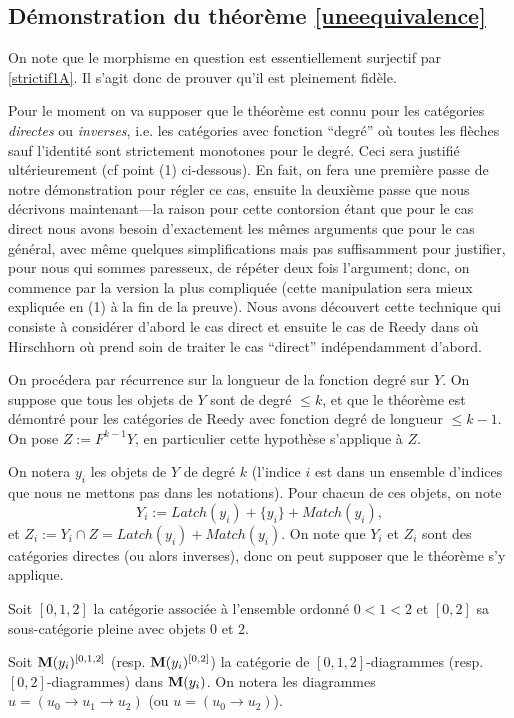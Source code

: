 \documentclass[12pt]{article}
\newcommand{\subnumero}[1]{\subsection*{#1}\phantomsection\addcontentsline{toc}{subsection}{#1}}
\newcommand{\mm}{{\bf M}}
\begin{document}
\subnumero{D\'emonstration du th\'eor\`eme \ref{uneequivalence}}
On note que le morphisme en question est essentiellement surjectif par
\ref{strictif1A}. Il s'agit donc de prouver qu'il est pleinement fid\`ele.

Pour le moment on va supposer que le th\'eor\`eme est connu pour les
cat\'egories {\em directes} ou {\em inverses}, i.e.
les cat\'egories avec fonction
``degr\'e'' o\`u toutes les fl\`eches sauf l'identit\'e sont strictement
monotones pour le degr\'e. Ceci sera justifi\'e ult\'erieurement (cf point (1)
ci-dessous). En fait, on fera une premi\`ere passe de notre d\'emonstration pour
r\'egler ce cas, ensuite la deuxi\`eme passe que nous d\'ecrivons
maintenant---la
raison pour cette contorsion \'etant que pour le cas direct nous avons besoin
d'exactement les m\^emes arguments que pour le cas g\'en\'eral, avec m\^eme
quelques simplifications mais pas suffisamment pour justifier, pour nous qui
sommes
paresseux, de r\'ep\'eter deux fois l'argument; donc, on commence par la version
la plus compliqu\'ee (cette manipulation sera mieux expliqu\'ee en (1) \`a la
fin de la preuve). Nous avons d\'ecouvert cette technique
qui consiste \`a consid\'erer d'abord le cas direct et
ensuite le cas de Reedy dans \cite{Hirschhorn} o\`u
Hirschhorn o\`u prend soin de traiter le cas ``direct'' ind\'ependamment
d'abord.

On proc\'edera par r\'ecurrence sur la longueur de la fonction degr\'e sur $Y$.
On suppose que tous les objets de $Y$ sont de degr\'e $\leq k$, et que le
th\'eor\`eme est d\'emontr\'e pour les cat\'egories de Reedy avec fonction
degr\'e de longueur $\leq k-1$. On pose $Z:= F^{k-1}Y$, en particulier cette
hypoth\`ese s'applique \`a $Z$.

On notera $y_i$ les objets de $Y$ de degr\'e $k$ (l'indice $i$ est dans un
ensemble d'indices que nous ne mettons pas dans les notations). Pour chacun de
ces objets, on note
$$
Y_i:= Latch(y_i)+\{ y _i\} +Match (y_i),
$$
et $Z_i := Y_i \cap Z= Latch(y_i)+Match(y_i)$. On note que $Y_i$ et $Z_i$ sont
des cat\'egories directes (ou alors inverses), donc on peut supposer que le
th\'eor\`eme s'y applique.

Soit $[0,1,2]$ la cat\'egorie associ\'ee \`a
l'ensemble ordonn\'e $0 < 1 < 2$ et
$[0,2]$ sa sous-cat\'egorie pleine avec objets $0$ et $2$.

Soit $\mm (y_i) ^{[0,1,2]}$
(resp. $\mm (y_i) ^{[0,2]}$)
la cat\'egorie de $[0,1,2]$-diagrammes (resp. $[0,2]$-diagrammes)
dans $\mm (y_i)$. On notera les diagrammes $u=(u_0\rightarrow u_1\rightarrow
u_2)$ (ou $u=(u_0\rightarrow u_2)$).
\end{document}
